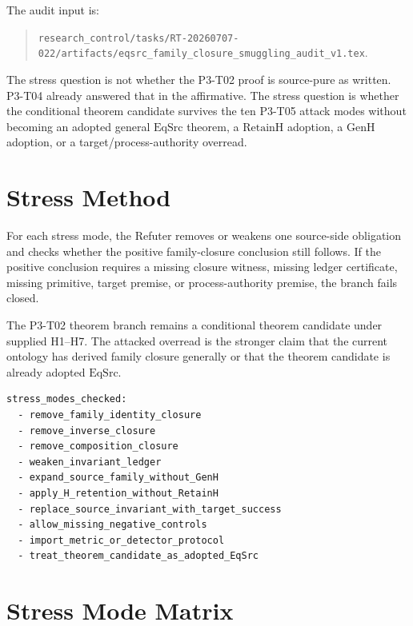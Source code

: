 \documentclass[11pt]{article}
\newcommand{\EqSrc}{\mathrm{EqSrc}}
\newcommand{\RetainH}{\mathrm{RetainH}}
\newcommand{\GenH}{\mathrm{GenH}}
\begin{document}
The audit input is:
\begin{quote}
\texttt{research\_control/tasks/RT-20260707-022/artifacts/eqsrc\_family\_closure\_smuggling\_audit\_v1.tex}.
\end{quote}

The stress question is not whether the P3-T02 proof is source-pure as written.
P3-T04 already answered that in the affirmative. The stress question is
whether the conditional theorem candidate survives the ten P3-T05 attack modes
without becoming an adopted general \(\EqSrc\) theorem, a \(\RetainH\)
adoption, a \(\GenH\) adoption, or a target/process-authority overread.

\section{Stress Method}

For each stress mode, the Refuter removes or weakens one source-side
obligation and checks whether the positive family-closure conclusion still
follows. If the positive conclusion requires a missing closure witness, missing
ledger certificate, missing primitive, target premise, or process-authority
premise, the branch fails closed.

The P3-T02 theorem branch remains a conditional theorem candidate under
supplied H1--H7. The attacked overread is the stronger claim that the current
ontology has derived family closure generally or that the theorem candidate is
already adopted \(\EqSrc\).

\begin{verbatim}
stress_modes_checked:
  - remove_family_identity_closure
  - remove_inverse_closure
  - remove_composition_closure
  - weaken_invariant_ledger
  - expand_source_family_without_GenH
  - apply_H_retention_without_RetainH
  - replace_source_invariant_with_target_success
  - allow_missing_negative_controls
  - import_metric_or_detector_protocol
  - treat_theorem_candidate_as_adopted_EqSrc
\end{verbatim}

\section{Stress Mode Matrix}
\end{document}
